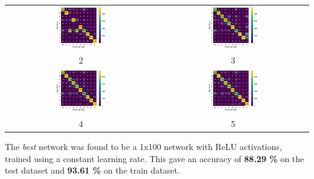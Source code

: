 \documentclass[12pt]{article}
\begin{document}
\begin{enumerate}[label=(\alph*)]
    \begin{center}
        \begin{tabular}{c c}
            \includegraphics[width=0.35\textwidth]{../Q2/mult_layer_relu/cmat_2.pdf} &
            \includegraphics[width=0.35\textwidth]{../Q2/mult_layer_relu/cmat_3.pdf} \\
            2 & 3 \\
            \includegraphics[width=0.35\textwidth]{../Q2/mult_layer_relu/cmat_4.pdf} &
            \includegraphics[width=0.35\textwidth]{../Q2/mult_layer_relu/cmat_5.pdf} \\
            4 & 5 
        \end{tabular}
    \end{center}

    The \emph{best} network was found to be a 1x100 network with ReLU activations,
    trained using a constant learning rate. This gave an accuracy of \textbf{88.29 \%}
    on the test dataset and \textbf{93.61 \%} on the train dataset.


\end{enumerate}
\end{document}

